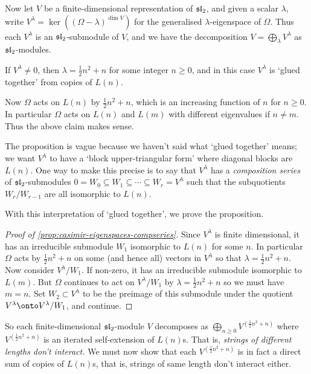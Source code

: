 Now let $V$ be a finite-dimensional representation of $\sl_2$, and given a
scalar $\lambda$, write $V^\lambda = \ker((\Omega-\lambda)^{\dim V})$ for the
generalised $\lambda$-eigenspace of $\Omega$. Thus each $V^\lambda$ is an
$\sl_2$-submodule of $V$, and we have the decomposition $V=\bigoplus_\lambda
V^\lambda$ as $\sl_2$-modules.

\begin{proposition}[(Vague)]
    \label{prop:casimir-eigenspaces-compseries}
    If $V^\lambda\neq 0$, then $\lambda=\frac{1}{2}n^2+n$ for some integer
    $n\geq 0$, and in this case $V^\lambda$ is `glued together' from copies of $L(n)$. 
\end{proposition}

Now $\Omega$ acts on $L(n)$ by $\frac{1}{2}n^2+n$, which is an increasing
function of $n$ for $n\geq 0$. In particular $\Omega$ acts on $L(n)$ and $L(m)$
with different eigenvalues if $n\neq m$. Thus the above claim makes sense. 

The proposition is vague because we haven't said what `glued together' means; we want
$V^\lambda$ to have a `block upper-triangular form' where diagonal blocks are
$L(n)$. One way to make this precise is to say that $V^\lambda$ has a
\emph{composition series} of $\sl_2$-submodules $0 = W_0 \subseteq W_1 \subseteq
\cdots \subseteq W_r = V^\lambda$ such that the subquotients $W_r/W_{r-1}$ are
all isomorphic to $L(n)$. 

With this interpretation of `glued together', we prove the proposition.

\begin{proof}[Proof of \cref{prop:casimir-eigenspaces-compseries}]
    Since $V^\lambda$ is finite dimensional, it has an irreducible submodule
    $W_1$ isomorphic to $L(n)$ for some $n$. In particular $\Omega$ acts by
    $\frac{1}{2}n^2+n$ on some (and hence all) vectors in $V^\lambda$ so that
    $\lambda=\frac{1}{2}n^2+n$. Now consider $V^\lambda/W_1$. If non-zero, it
    has an irreducible submodule isomorphic to $L(m)$. But $\Omega$
    continues to act on $V^\lambda/W_1$ by $\lambda=\frac{1}{2}n^2+n$ so we must
    have $m=n$. Set $W_2\subset V^\lambda$ to be the preimage of this submodule
    under the quotient $V^\lambda\onto V^\lambda/W_1$, and continue.
\end{proof}

So each finite-dimensional $\sl_2$-module $V$ decomposes as $\bigoplus_{n\geq 0}
V^{(\frac{1}{2}n^2+n)}$ where $V^{(\frac{1}{2}n^2+n)}$ is an iterated
self-extension of $L(n)$s. That is, \emph{strings of different lengths don't
interact.} We must now show that each $V^{(\frac{1}{2}n^2+n)}$ is in fact a
direct sum of copies of $L(n)$s, that is, strings of same length don't interact
either. 

